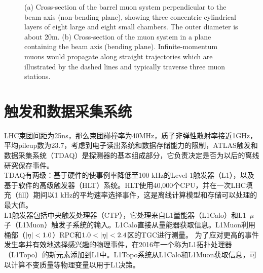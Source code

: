 \begin{figure}[h]
\begin{center}
\begin{subfigure}[b]{0.45\textwidth}
      \caption{}
      \label{fig:muon_rz}
  \end{subfigure}
\caption{(a) Cross-section of the barrel muon system perpendicular to the beam axis (non-bending plane), showing three concentric cylindrical layers of eight large and eight small chambers. The outer diameter is about 20m. (b) Cross-section of the muon system in a plane containing the beam axis (bending plane). Infinite-momentum muons would propagate along straight trajectories which are illustrated by the dashed lines and typically traverse three muon stations.} \label{fig:muon_overview}
\end{center}
\end{figure}

\section{触发和数据采集系统}
LHC束团间距为25ns，那么束团碰撞率为40MHz，质子非弹性散射率接近1GHz，平均pileup数为23.7，考虑到电子读出系统和数据存储能力的限制，ATLAS触发和数据采集系统（TDAQ）\cite{Aaboud2017}是探测器的基本组成部分，它负责决定是否为以后的离线研究保存事件。\\
TDAQ有两级：基于硬件的使事例率降低至100 kHz的Level-1触发器（L1），以及基于软件的高级触发器（HLT）系统。HLT使用40,000个CPU，并在一次LHC填充（fill）期间以1 kHz的平均速率选择事件，这是离线计算模型和存储可以处理的最大值。\\
L1触发器包括中央触发处理器（CTP），它处理来自L1量能器（L1Calo）和L1~$\mu$子（L1Muon）触发子系统的输入。L1Calo直接从量能器获取信息。L1Muon利用桶部（$|\eta|<1.0$）RPC和$1.0<\abseta<2.4$区的TGC进行测量。
为了应对更高的事件发生率并有效地选择感兴趣的物理事件，在2016年一个称为L1拓扑处理器（L1Topo）\cite{Simioni:2014nha}的新元素添加到L1中。L1Topo系统从L1Calo和L1Muon获取信息，可以计算不变质量等物理变量以用于L1决策。
